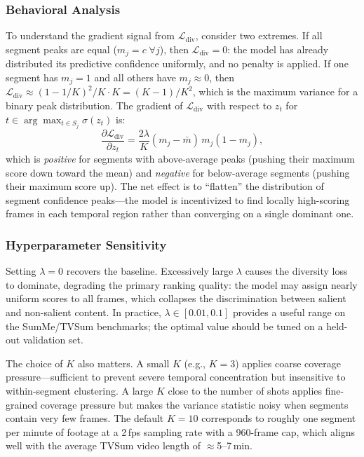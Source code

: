 \documentclass[10pt,conference]{IEEEtran}
\begin{document}
\subsubsection{Behavioral Analysis}

To understand the gradient signal from $\mathcal{L}_{\mathrm{div}}$, consider
two extremes. If all segment peaks are equal ($m_j = c\;\forall j$), then
$\mathcal{L}_{\mathrm{div}} = 0$: the model has already distributed its
predictive confidence uniformly, and no penalty is applied. If one segment has
$m_j = 1$ and all others have $m_j \approx 0$, then
$\mathcal{L}_{\mathrm{div}} \approx (1-1/K)^2/K \cdot K = (K-1)/K^2$, which
is the maximum variance for a binary peak distribution. The gradient of
$\mathcal{L}_{\mathrm{div}}$ with respect to $z_t$ for $t \in \arg\max_{t \in S_j}
\sigma(z_t)$ is:
\begin{equation}
  \frac{\partial \mathcal{L}_{\mathrm{div}}}{\partial z_t}
  = \frac{2\lambda}{K}(m_j - \bar{m})\,m_j(1-m_j),
\end{equation}
which is \emph{positive} for segments with above-average peaks (pushing their
maximum score down toward the mean) and \emph{negative} for below-average
segments (pushing their maximum score up). The net effect is to ``flatten'' the
distribution of segment confidence peaks---the model is incentivized to find
locally high-scoring frames in each temporal region rather than converging on
a single dominant one.

\subsubsection{Hyperparameter Sensitivity}

Setting $\lambda = 0$ recovers the baseline. Excessively large $\lambda$
causes the diversity loss to dominate, degrading the primary ranking quality:
the model may assign nearly uniform scores to all frames, which collapses the
discrimination between salient and non-salient content. In practice, $\lambda
\in [0.01, 0.1]$ provides a useful range on the SumMe/TVSum benchmarks;
the optimal value should be tuned on a held-out validation set.

The choice of $K$ also matters. A small $K$ (e.g., $K=3$) applies coarse
coverage pressure---sufficient to prevent severe temporal concentration but
insensitive to within-segment clustering. A large $K$ close to the number of
shots applies fine-grained coverage pressure but makes the variance statistic
noisy when segments contain very few frames. The default $K=10$ corresponds
to roughly one segment per minute of footage at a 2\,fps sampling rate with a
960-frame cap, which aligns well with the average TVSum video length of
$\approx$5--7\,min.
\end{document}
